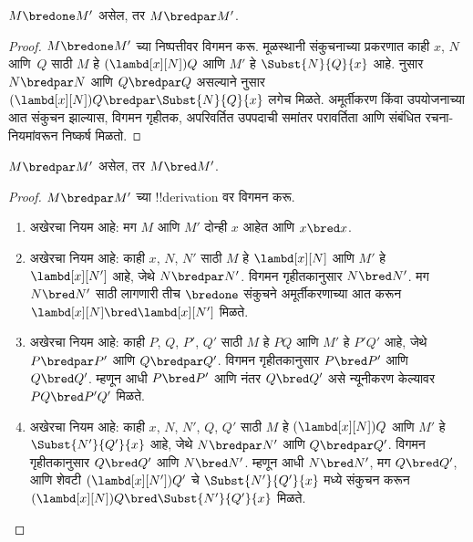 \documentclass[../../../include/open-logic-section]{subfiles}
\begin{document}


\begin{lem}
  $M \bredone M'$ असेल, तर $M \bredpar M'$.
\end{lem}
\begin{proof} $M \bredone M'$ च्या निष्पत्तीवर विगमन करू.
  मूळस्थानी संकुचनाच्या प्रकरणात काही $x$, $N$ आणि~$Q$ साठी
  $M$ हे $(\lambd[x][N])Q$ आणि $M'$ हे
  $\Subst{N}{Q}{x}$ आहे.  नुसार
  $N \bredpar N$ आणि $Q \bredpar Q$ असल्याने
   नुसार
  $(\lambd[x][N])Q \bredpar \Subst{N}{Q}{x}$ लगेच मिळते.
  अमूर्तीकरण किंवा उपयोजनाच्या आत संकुचन झाल्यास,
  विगमन गृहीतक, अपरिवर्तित उपपदाची समांतर परावर्तिता
  आणि संबंधित रचना-नियमांवरून निष्कर्ष मिळतो.
\end{proof}

\begin{lem}
  $M \bredpar M'$ असेल, तर $M \bred M'$.
\end{lem}

\begin{proof} $M \bredpar M'$ च्या !!{derivation} वर विगमन करू.
  \begin{enumerate}
  \item अखेरचा नियम  आहे: मग $M$
    आणि $M'$ दोन्ही $x$ आहेत आणि $x \bred x$.
  \item अखेरचा नियम  आहे: काही
    $x$, $N$, $N'$ साठी $M$ हे $\lambd[x][N]$
    आणि $M'$ हे $\lambd[x][N']$ आहे, जेथे
    $N \bredpar N'$. विगमन गृहीतकानुसार $N \bred N'$.
    मग $N \bred N'$ साठी लागणारी तीच $\bredone$
    संकुचने अमूर्तीकरणाच्या आत करून
    $\lambd[x][N] \bred \lambd[x][N']$ मिळते.
  \item अखेरचा नियम  आहे: काही
    $P$, $Q$, $P'$, $Q'$ साठी $M$ हे $PQ$ आणि
    $M'$ हे $P'Q'$ आहे, जेथे $P \bredpar P'$
    आणि $Q \bredpar Q'$. विगमन गृहीतकानुसार
    $P \bred P'$ आणि $Q \bred Q'$. म्हणून आधी
    $P \bred P'$ आणि नंतर $Q \bred Q'$ असे
    न्यूनीकरण केल्यावर $PQ \bred P'Q'$ मिळते.
  \item अखेरचा नियम  आहे: काही
    $x$, $N$, $N'$, $Q$, $Q'$ साठी $M$ हे
    $(\lambd[x][N])Q$ आणि $M'$ हे
    $\Subst{N'}{Q'}{x}$ आहे, जेथे $N \bredpar N'$
    आणि $Q \bredpar Q'$. विगमन गृहीतकानुसार
    $Q \bred Q'$ आणि $N \bred N'$. म्हणून आधी
    $N \bred N'$, मग $Q \bred Q'$, आणि शेवटी
    $(\lambd[x][N'])Q'$ चे $\Subst{N'}{Q'}{x}$
    मध्ये संकुचन करून
    $(\lambd[x][N])Q \bred \Subst{N'}{Q'}{x}$ मिळते.
  \end{enumerate}
\end{proof}
\end{document}
